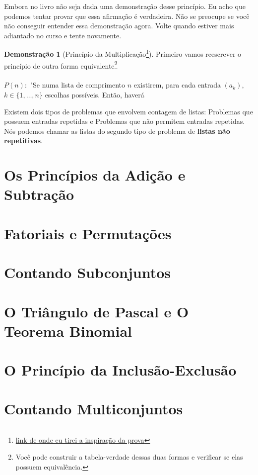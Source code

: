 \documentclass[a4paper,11pt]{book}
\theoremstyle{definition}
\theoremstyle{break}
\newtheorem{demonstration}{Demonstração}[section]
\begin{document}
Embora no livro não seja dada uma demonstração desse princípio. Eu acho que podemos tentar provar que essa afirmação é verdadeira. Não se preocupe se você não conseguir entender essa demonstração agora. Volte quando estiver mais adiantado no curso e tente novamente.

\begin{demonstration}[Princípio da Multiplicação\footnote{\href{https://math.stackexchange.com/questions/3053969/using-induction-to-prove-the-multiplication-rule}{link de onde eu tirei a inspiração da prova}}]

Primeiro vamos reescrever o princípio de outra forma equivalente\footnote{Você pode construir a tabela-verdade dessas duas formas e verificar se elas possuem equivalência.} 
\\
\\
$P(n) : $ "Se numa lista de comprimento $n$ existirem, para cada entrada $(a_k)$, $k \in \{1, \dots, n \}$ escolhas possíveis. Então, haverá 

\end{demonstration}


Existem dois tipos de problemas que envolvem contagem de listas: Problemas que possuem entradas repetidas e Problemas que não permitem entradas repetidas. Nós podemos chamar as listas do segundo tipo de problema de \textbf{listas não repetitivas}.

\section{Os Princípios da Adição e Subtração}
\section{Fatoriais e Permutações}
\section{Contando Subconjuntos}
\section{O Triângulo de Pascal e O Teorema Binomial}
\section{O Princípio da Inclusão-Exclusão}
\section{Contando Multiconjuntos}
\end{document}
